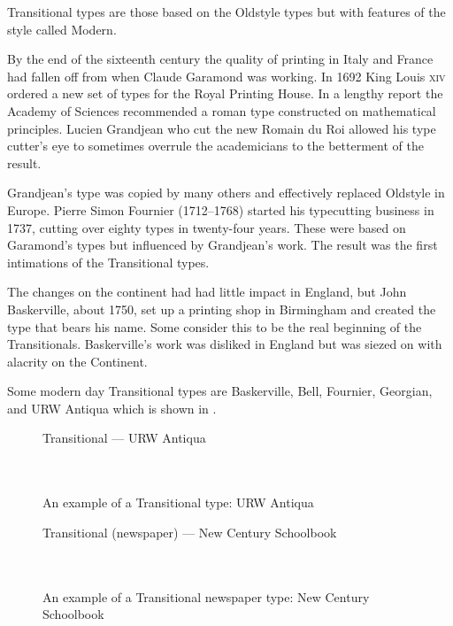 \documentclass[10pt,letterpaper,extrafontsizes]{memoir}
\begin{document}
    Transitional types are those based on the Oldstyle 
types but with features of the style called Modern. 

    By the end of the sixteenth century the quality of printing in Italy 
and France had fallen off from when Claude Garamond 
was working. In 1692
King Louis \textsc{xiv} ordered a new set of types for the Royal Printing
House. In a lengthy report the Academy of Sciences recommended a roman type
constructed on mathematical principles. 
Lucien Grandjean who cut the
new Romain du Roi allowed his type cutter's eye to 
sometimes overrule the 
academicians to the betterment of the result.

    Grandjean's type was copied by many others and effectively replaced 
Oldstyle in Europe. Pierre Simon Fournier 
(1712--1768) started his typecutting 
business in 1737, cutting over eighty types in twenty-four years. These were
based on Garamond's types but influenced by Grandjean's work. The result was
the first intimations of the Transitional types.

    The changes on the continent had had little impact in England, but John
Baskerville, about 1750, set up a printing shop 
in Birmingham and created the type that bears his name. Some consider this
to be the real beginning of the Transitionals. Baskerville's work was
disliked in England but was siezed on with alacrity on the Continent.

    Some modern day Transitional types are 
Baskerville, 
Bell, 
Fournier,
Georgian,
and URW Antiqua which is shown in .

\begin{figure}
\centering
{\centering{}\selectfont
  Transitional --- URW Antiqua \\
  \UCalphabet \\
  \LCalphabet \\
  \fox\par}
\caption{An example of a Transitional type: URW Antiqua} 
   \label{fig:antiqua}
\end{figure}

\begin{figure}
\centering
{\centering{}\selectfont
  Transitional (newspaper) --- New Century Schoolbook \\
  \UCalphabet \\
  \LCalphabet \\
  \fox\par}
\caption{An example of a Transitional newspaper type: New Century Schoolbook} 
   \label{fig:newcent}
\end{figure}
\end{document}
